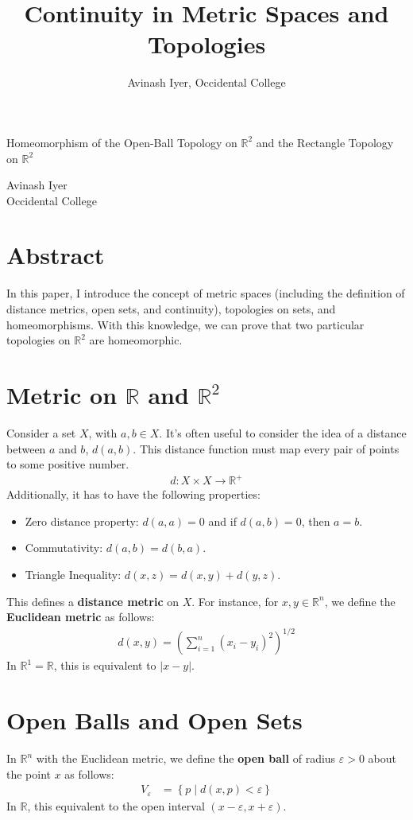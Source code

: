 \documentclass[12pt]{extarticle}
\title{Continuity in Metric Spaces and Topologies}
\author{Avinash Iyer, Occidental College}
\date{}
\newcommand{\R}{\mathbb{R}}
\begin{document}
\doublespacing
  \begin{center}
    \large \sc Homeomorphism of the Open-Ball Topology on $\R^2$ and the Rectangle Topology on $\R^2$
  \end{center}
  \begin{center}
    Avinash Iyer\\
    Occidental College
  \end{center}
  \section*{Abstract}%
  In this paper, I introduce the concept of metric spaces (including the definition of distance metrics, open sets, and continuity), topologies on sets, and homeomorphisms. With this knowledge, we can prove that two particular topologies on $\R^2$ are homeomorphic.
  \section*{Metric on $\R$ and $\R^2$}%
  Consider a set $X$, with $a,b\in X$. It's often useful to consider the idea of a distance between $a$ and $b$, $d(a,b)$. This distance function must map every pair of points to some positive number.
  \begin{align*}
    d: X\times X \rightarrow \R^+
  \end{align*}
  Additionally, it has to have the following properties:
  \begin{itemize}
    \item Zero distance property: $d(a,a) = 0$ and if $d(a,b) = 0$, then $a = b$.
    \item Commutativity: $d(a,b) = d(b,a)$.
    \item Triangle Inequality: $d(x,z) = d(x,y) + d(y,z)$.
  \end{itemize}
  This defines a \textbf{distance metric} on $X$. For instance, for $x,y\in\R^n$, we define the \textbf{Euclidean metric} as follows:
  \begin{align*}
    d(x,y) = \left(\sum_{i=1}^{n}(x_i-y_i)^2\right)^{1/2}
  \end{align*}
  In $\R^1 = \R$, this is equivalent to $|x-y|$.
  \section*{Open Balls and Open Sets}%
  In $\R^n$ with the Euclidean metric, we define the \textbf{open ball} of radius $\varepsilon > 0$ about the point $x$ as follows:
  \begin{align*}
    V_{\varepsilon} &= \left\{p \mid d(x,p) < \varepsilon\right\}
  \end{align*}
  In $\R$, this equivalent to the open interval $(x-\varepsilon,x+\varepsilon)$.\\
\end{document}
